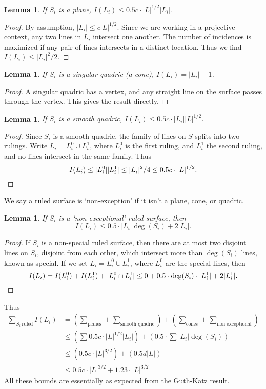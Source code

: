 \documentclass{article}
\theoremstyle{plain}
\newtheorem{lemma}[theorem]{Lemma}
\begin{document}
\begin{lemma}
    If $S_i$ is a plane, $I(L_i) \leq 0.5c \cdot |L|^{1/2} |L_i|$.
\end{lemma}
\begin{proof}
    By assumption, $|L_i| \leq c |L|^{1/2}$. Since we are working in a projective context, any two lines in $L_i$ intersect one another. The number of incidences is maximized if any pair of lines intersects in a distinct location. Thus we find $I(L_i) \leq |L_i|^2/2$.
\end{proof}

\begin{lemma}
    If $S_i$ is a singular quadric (a cone), $I(L_i) = |L_i| - 1$.
\end{lemma}
\begin{proof}
    A singular quadric has a vertex, and any straight line on the surface passes through the vertex. This gives the result directly.
\end{proof}

\begin{lemma}
    If $S_i$ is a smooth quadric, $I(L_i) \leq 0.5c \cdot |L_i| |L|^{1/2}$.
\end{lemma}
\begin{proof}
    Since $S_i$ is a smooth quadric, the family of lines on $S$ splits into two rulings. Write $L_i = L_i^0 \cup L_i^1$, where $L_i^0$ is the first ruling, and $L_i^1$ the second ruling, and no lines intersect in the same family. Thus
    \[ I(L_i) \leq |L_i^0| |L_i^1| \leq |L_i|^2/4 \leq 0.5c \cdot |L|^{1/2}. \qedhere \]
\end{proof}

We say a ruled surface is `non-exception' if it isn't a plane, cone, or quadric.

\begin{lemma}
    If $S_i$ is a `non-exceptional' ruled surface, then
    \[ I(L_i) \leq 0.5 \cdot |L_i| \deg(S_i) + 2 |L_i|. \]
\end{lemma}
\begin{proof}
    If $S_i$ is a non-special ruled surface, then there are at most two disjoint lines on $S_i$, disjoint from each other, which intersect more than $\deg(S_i)$ lines, known as special. If we set $L_i = L_i^0 \cup L_i^1$, where $L_i^0$ are the special lines, then
    \[ I(L_i) = I(L_i^0) + I(L_i^1) + |L_i^0 \cap L_i^1| \leq 0 + 0.5 \cdot \deg(S_i) \cdot |L_i^1| + 2|L_i^1|.\qedhere \]
\end{proof}

Thus
%
\begin{align*}
    \sum_{S_i\ \text{ruled}} I(L_i) &= \left( \sum_{\text{planes}} + \sum_{\text{smooth quadric}} \right) + \left( \sum_{\text{cones}} + \sum_{\text{non exceptional}} \right)\\
    &\leq \left( \sum 0.5c \cdot |L|^{1/2} |L_i| \right) + \left( 0.5 \cdot \sum |L_i| \deg(S_i) \right)\\
    &\leq \left( 0.5c \cdot |L|^{3/2} \right) + \left( 0.5 d |L| \right)\\
    &\leq 0.5c \cdot |L|^{3/2} + 1.23 \cdot |L|^{3/2}
\end{align*}
%
All these bounds are essentially as expected from the Guth-Katz result.
\end{document}
